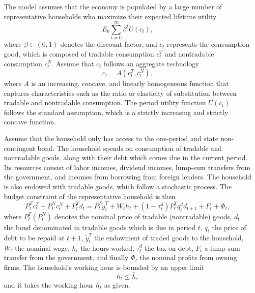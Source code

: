 The model assumes that the economy is populated by a large number of representative households who maximize their expected lifetime utility
\begin{equation}
    \label{eq:utility}
    E_0 \sum_{t=0}^\infty \beta^t U(c_t),
\end{equation}
where $\beta \in(0,1)$ denotes the discount factor,
and $c_t$ represents the consumption good, which is composed of
tradable consumption $c_t^T$ and nontradable consumption $c_t^N$.
Assume that $c_t$ follows an aggregate technology
\begin{equation}
    \label{eq:A}
    c_t = A(c^T_t, c^N_t),
\end{equation}
where $A$ is an increasing, concave, and linearly homogeneous function that captures characteristics such as the ratio or elasticity of substitution between tradable and nontradable consumption.
The period utility function $U(c_t)$ follows the standard assumption, which is a strictly increasing and strictly concave function.

Assume that the household only has access to the one-period and state non-contingent bond.
The household spends on consumption of tradable and nontradable goods, along with their debt which comes due in the current period. Its resources consist of labor incomes, dividend incomes, lump-sum transfers from the government, and incomes from borrowing from foreign lenders. The household is also endowed with tradable goods, which follow a stochastic process.
The budget constraint of the representative household is then
\begin{equation}
    \label{eq:bc}
    P^T_t c^T_t + P^N_t c^N_t + P^T_t d_t =
    P^T_t \tilde{y}^T_t + W_t h_t + (1- \tau^d_t)P^T_t q^d_t d_{t+1} + F_t + \Phi_t,
\end{equation}
where $P^T_t (P^N_t)$ denotes the nominal price of tradable (nontradable) goods, $d_t$ the bond denominated in tradable goods which is due in period $t$, $q_t$ the price of debt to be repaid at $t+1$, $\tilde{y}^T_t$ the endowment of traded goods to the household, $W_t$ the nominal wage, $h_t$ the hours worked, $\tau^d_t$ the tax on debt, $F_t$ a lump-sum transfer from the government, and finally $\Phi_t$ the nominal profits from owning firms.
The household's working hour is bounded by an upper limit
\begin{equation}
    \label{eq:h-constraint}
    h_t \le \bar{h},
\end{equation}
and it takes the working hour $h_t$ as given.

